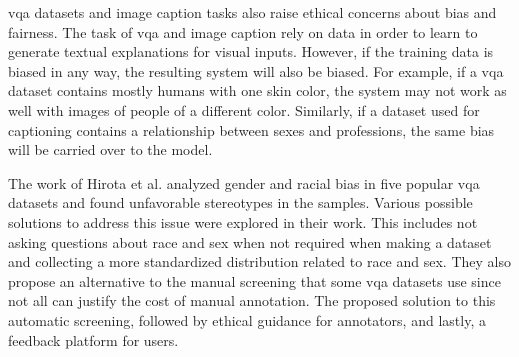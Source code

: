 


\gls{vqa} datasets and image caption tasks also raise ethical concerns about bias and fairness. The task of \gls{vqa} and image caption rely on data in order to learn to generate textual explanations for visual inputs. However, if the training data is biased in any way, the resulting system will also be biased. For example, if a \gls{vqa} dataset contains mostly humans with one skin color, the system may not work as well with images of people of a different color. 
Similarly, if a dataset used for captioning contains a relationship between sexes and professions, the same bias will be carried over to the model.


The work of Hirota et al. \cite{hirotaGenderRacialBias2022} analyzed gender and racial bias in five popular \gls{vqa} datasets and found unfavorable stereotypes in the samples. 
Various possible solutions to address this issue were explored in their work.
This includes not asking questions about race and sex when not required when making a dataset and collecting a more standardized distribution related to race and sex. 
They also propose an alternative to the manual screening that some \gls{vqa} datasets use since not all can justify the cost of manual annotation. The proposed solution to this automatic screening, followed by ethical guidance for annotators, and lastly, a feedback platform for users.


